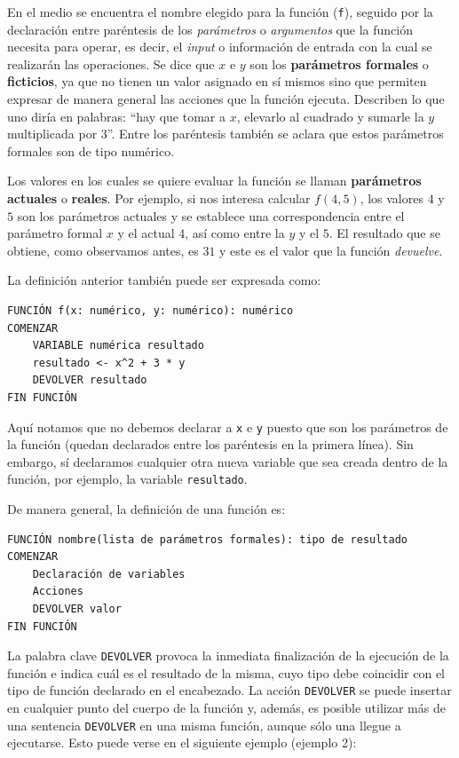 \documentclass[
]{book}
\begin{document}
En el medio se encuentra el nombre elegido para la función (\texttt{f}), seguido por la declaración entre paréntesis de los \emph{parámetros} o \emph{argumentos} que la función necesita para operar, es decir, el \emph{input} o información de entrada con la cual se realizarán las operaciones. Se dice que \(x\) e \(y\) son los \textbf{parámetros formales} o \textbf{ficticios}, ya que no tienen un valor asignado en sí mismos sino que permiten expresar de manera general las acciones que la función ejecuta. Describen lo que uno diría en palabras: ``hay que tomar a \(x\), elevarlo al cuadrado y sumarle la \(y\) multiplicada por 3''. Entre los paréntesis también se aclara que estos parámetros formales son de tipo numérico.

Los valores en los cuales se quiere evaluar la función se llaman \textbf{parámetros actuales} o \textbf{reales}. Por ejemplo, si nos interesa calcular \(f(4, 5)\), los valores \(4\) y \(5\) son los parámetros actuales y se establece una correspondencia entre el parámetro formal \(x\) y el actual \(4\), así como entre la \(y\) y el \(5\). El resultado que se obtiene, como observamos antes, es \(31\) y este es el valor que la función \emph{devuelve}.

La definición anterior también puede ser expresada como:

\begin{verbatim}
FUNCIÓN f(x: numérico, y: numérico): numérico
COMENZAR
    VARIABLE numérica resultado
    resultado <- x^2 + 3 * y
    DEVOLVER resultado
FIN FUNCIÓN
\end{verbatim}

Aquí notamos que no debemos declarar a \texttt{x} e \texttt{y} puesto que son los parámetros de la función (quedan declarados entre los paréntesis en la primera línea). Sin embargo, sí declaramos cualquier otra nueva variable que sea creada dentro de la función, por ejemplo, la variable \texttt{resultado}.

De manera general, la definición de una función es:

\begin{verbatim}
FUNCIÓN nombre(lista de parámetros formales): tipo de resultado
COMENZAR
    Declaración de variables
    Acciones
    DEVOLVER valor
FIN FUNCIÓN
\end{verbatim}

La palabra clave \texttt{DEVOLVER} provoca la inmediata finalización de la ejecución de la función e indica cuál es el resultado de la misma, cuyo tipo debe coincidir con el tipo de función declarado en el encabezado. La acción \texttt{DEVOLVER} se puede insertar en cualquier punto del cuerpo de la función y, además, es posible utilizar más de una sentencia \texttt{DEVOLVER} en una misma función, aunque sólo una llegue a ejecutarse. Esto puede verse en el siguiente ejemplo (ejemplo 2):
\end{document}
